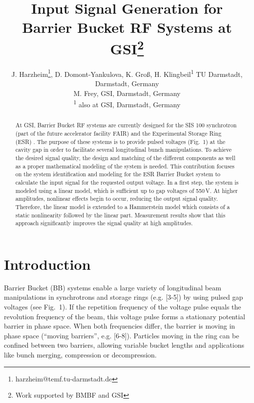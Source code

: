 \documentclass[a4paper,
               keeplastbox,%
               nospread%
              ]{jacow}
\begin{document}
\title{Input Signal Generation for Barrier Bucket RF Systems at GSI\thanks{Work supported by BMBF and GSI}}

\author{J. Harzheim\thanks{harzheim@temf.tu-darmstadt.de}, D. Domont-Yankulova, K. Groß, H. Klingbeil\textsuperscript{1} TU Darmstadt, Darmstadt, Germany
	\\
	M.  Frey, GSI, Darmstadt, Germany
	\\
	\textsuperscript{1} also at GSI, Darmstadt, Germany}
	
\maketitle

%
\begin{abstract}
	 At GSI, Barrier Bucket RF systems are currently designed for the SIS 100 synchrotron (part of the future accelerator 
	 facility FAIR) \cite{FAIR} and the Experimental Storage Ring (ESR) \cite{Demo_BB_ESR}. The purpose of these systems is 
	 to provide pulsed voltages (Fig.~1) at the cavity gap in order to facilitate several longitudinal bunch manipulations.	 
	 To achieve the desired signal quality, the design and matching of the different components as well as a proper mathematical modeling
	 of the system is needed. This contribution focuses on the system identification and modeling for the ESR Barrier Bucket system to
	 calculate the input signal for the requested output voltage.
	 In a first step, the system is modeled using a linear model, which is sufficient up to gap voltages of 550\,V. 
	 At higher amplitudes, nonlinear effects begin to occur, reducing the output signal quality. Therefore, the linear model is extended to a Hammerstein 
	 model which consists of a static nonlinearity followed by the linear part. Measurement results show that this approach significantly improves the 
	 signal quality at high amplitudes.
	 
\end{abstract}

\section{Introduction} %
	 
	 Barrier Bucket (BB) systems enable a large variety of longitudinal beam manipulations in synchrotrons and storage rings  (e.g. [3-5]) by using %
	 pulsed gap voltages (see Fig.~1). If the repetition frequency of the voltage pulse equals the revolution frequency of the 
	 beam, this voltage pulse forms a stationary potential barrier in phase space. When both frequencies differ, the barrier is moving in phase space (``moving barriers'', e.g. [6-8]). %
	 Particles moving in the ring can be confined between two barriers, allowing variable bucket lengths and applications like bunch merging, compression or 
	 decompression.
	 
\end{document}
